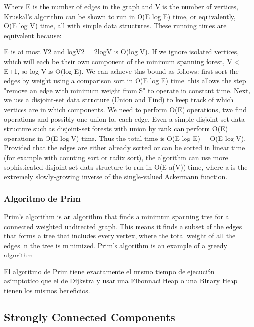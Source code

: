 \documentclass[10pt,letterpaper,twocolumn,twosided]{article}
\newcommand{\codigofuente}[1]{

\dotfill
}
\begin{document}
Where E is the number of edges in the graph and V is the number of vertices, Kruskal's algorithm can be shown to run in O(E log E) time, or equivalently, O(E log V) time, all with simple data structures. These running times are equivalent because:

E is at most V2 and logV2 = 2logV  is O(log V).
If we ignore isolated vertices, which will each be their own component of the minimum spanning forest, V <= E+1, so log V is O(log E).
We can achieve this bound as follows: first sort the edges by weight using a comparison sort in O(E log E) time; this allows the step "remove an edge with minimum weight from S" to operate in constant time. Next, we use a disjoint-set data structure (Union and Find) to keep track of which vertices are in which components. We need to perform O(E) operations, two find operations and possibly one union for each edge. Even a simple disjoint-set data structure such as disjoint-set forests with union by rank can perform O(E) operations in O(E log V) time. Thus the total time is O(E log E) = O(E log V).
Provided that the edges are either already sorted or can be sorted in linear time (for example with counting sort or radix sort), the algorithm can use more sophisticated disjoint-set data structure to run in O(E a(V)) time, where a is the extremely slowly-growing inverse of the single-valued Ackermann function.

\codigofuente{src/graphs/kruskal.cpp}

\subsubsection{Algoritmo de Prim}

Prim's algorithm is an algorithm that finds a minimum spanning tree for a connected weighted undirected graph. This means it finds a subset of the edges that forms a tree that includes every vertex, where the total weight of all the edges in the tree is minimized. Prim's algorithm is an example of a greedy algorithm. 

El algoritmo de Prim tiene exactamente el mismo tiempo de ejecución asimptotico que el de Dijkstra y usar una Fibonnaci Heap o una Binary Heap tienen los mismos beneficios.

\codigofuente{src/graphs/prim.cpp}

\subsection{Strongly Connected Components}
\end{document}
